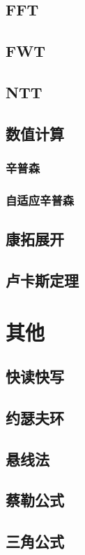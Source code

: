 \documentclass[twocolumn,a4]{article}
\newcommand{\addcpp}[1]{}
\begin{document}
	\subsection{FFT}
	\subsection{FWT}
	\subsection{NTT}
	\subsection{数值计算}
		\subsubsection{辛普森}
		\subsubsection{自适应辛普森}
	\subsection{康拓展开}
	\subsection{卢卡斯定理}

\section{其他}
	\subsection{快读快写}
	\subsection{约瑟夫环}
	\subsection{悬线法}
	\subsection{蔡勒公式}
	\subsection{三角公式}
\end{document}
